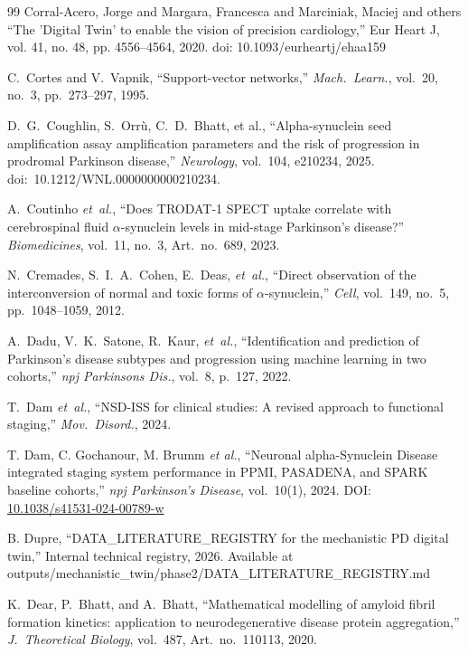 \begin{thebibliography}{99}
 Corral-Acero, Jorge and Margara, Francesca and Marciniak, Maciej and others ``The 'Digital Twin' to enable the vision of precision cardiology,'' Eur Heart J, vol. 41, no. 48, pp. 4556--4564, 2020. doi: 10.1093/eurheartj/ehaa159

C.~Cortes and V.~Vapnik, ``Support-vector networks,'' \textit{Mach.\ Learn.}, vol.~20, no.~3, pp.~273--297, 1995.

D.~G.~Coughlin, S.~Orrù, C.~D.~Bhatt, et al., ``Alpha-synuclein seed amplification assay amplification parameters and the risk of progression in prodromal Parkinson disease,'' \textit{Neurology}, vol.~104, e210234, 2025. doi:~10.1212/WNL.0000000000210234.

A.~Coutinho \textit{et~al.}, ``Does TRODAT-1 SPECT uptake correlate with cerebrospinal fluid $\alpha$-synuclein levels in mid-stage Parkinson's disease?'' \textit{Biomedicines}, vol.~11, no.~3, Art.\ no.~689, 2023.

N.~Cremades, S.~I.~A.~Cohen, E.~Deas, \textit{et~al.}, ``Direct observation of the interconversion of normal and toxic forms of $\alpha$-synuclein,'' \textit{Cell}, vol.~149, no.~5, pp.~1048--1059, 2012.


A.~Dadu, V.~K.~Satone, R.~Kaur, \textit{et~al.}, ``Identification and prediction of Parkinson's disease subtypes and progression using machine learning in two cohorts,'' \textit{npj Parkinsons Dis.}, vol.~8, p.~127, 2022.

T.~Dam \textit{et~al.}, ``NSD-ISS for clinical studies: A revised approach to functional staging,'' \textit{Mov.\ Disord.}, 2024.

T. Dam, C. Gochanour, M. Brumm \textit{et al.},
``Neuronal alpha-Synuclein Disease integrated staging system performance in PPMI, PASADENA, and SPARK baseline cohorts,''
\textit{npj Parkinson's Disease}, vol.~10(1), 2024. DOI: \href{https://doi.org/10.1038/s41531-024-00789-w}{10.1038/s41531-024-00789-w}

 B. Dupre, ``DATA\_LITERATURE\_REGISTRY for the mechanistic PD digital twin,'' Internal technical registry, 2026. Available at outputs/mechanistic\_twin/phase2/DATA\_LITERATURE\_REGISTRY.md

K.~Dear, P.~Bhatt, and A.~Bhatt, ``Mathematical modelling of amyloid fibril formation kinetics: application to neurodegenerative disease protein aggregation,'' \textit{J.\ Theoretical Biology}, vol.~487, Art.\ no.~110113, 2020.


\end{thebibliography}

